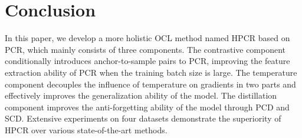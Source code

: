 \section{Conclusion}
\label{sec:conclusion}
In this paper, we develop a more holistic OCL method named HPCR based on PCR, which mainly consists of three components. The contrastive component conditionally introduces anchor-to-sample pairs to PCR, improving the feature extraction ability of PCR when the training batch size is large. The temperature component decouples the influence of temperature on gradients in two parts and effectively improves the generalization ability of the model. The distillation component improves the anti-forgetting ability of the model through PCD and SCD. Extensive experiments on four datasets demonstrate the superiority of HPCR over various state-of-the-art methods.

